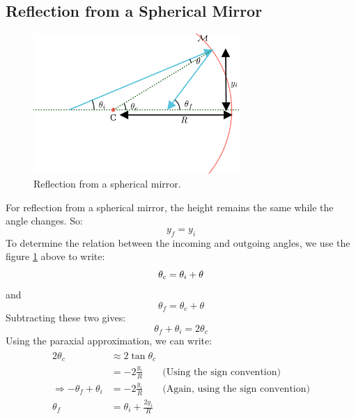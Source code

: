 \documentclass[12pt]{article}
\begin{document}
\subsection{Reflection from a Spherical Mirror}
\begin{figure}[h]
    \centering
    \includegraphics[width=0.7\textwidth]{images/reflection.png}
    \caption{Reflection from a spherical mirror.}
    \label{fig:reflection}
\end{figure}
For reflection from a spherical mirror, the height remains the same while the angle changes. So:
\begin{equation*}
    y_f = y_i
\end{equation*}
To determine the relation between the incoming and outgoing angles, we use the figure \ref{fig:reflection} above to write:
\begin{equation*}
    \theta_c = \theta_i + \theta\\
\end{equation*}
and
\begin{equation*}
    \theta_f = \theta_c + \theta
\end{equation*}
Subtracting these two gives:
\begin{equation}
    \label{eq:theta-f}
    \theta_f + \theta_i = 2\theta_c
\end{equation}
Using the paraxial approximation, we can write:
\begin{align}
    \begin{split}
        2\theta_c &\approx 2 \tan{\theta_c}\\
        & = -2\frac{y_i}{R} \quad \quad\text{(Using the sign convention)}\\
        \Rightarrow -\theta_f + \theta_i &= -2\frac{y_i}{R} \quad \quad\text{(Again, using the sign convention)}\\
        \theta_f &= \theta_i + \frac{2y_i}{R}
    \end{split}
\end{align}
\end{document}
